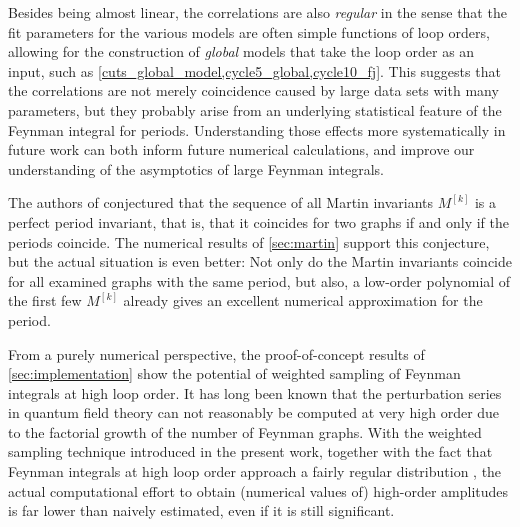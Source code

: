 \documentclass[12pt]{article}
\numberwithin{equation}{section}
\begin{document}
Besides being almost linear,  the correlations are also \emph{regular} in the sense that the fit parameters for the various models are often simple functions of loop orders, allowing for the construction of \emph{global} models that take the loop order as an input, such as \cref{cuts_global_model,cycle5_global,cycle10_fj}. This suggests that the correlations are not merely coincidence caused by large data sets with many parameters, but they probably arise from an underlying statistical feature of the Feynman integral for periods. Understanding those effects more systematically in future work can both inform future numerical calculations, and improve our understanding of the asymptotics of large Feynman integrals.  


The authors of \cite{panzer_feynman_2023}  conjectured that the sequence of all Martin invariants $M^{[k]}$ is a perfect period invariant, that is, that it coincides for two graphs if and only if the periods coincide. The numerical results of \cref{sec:martin} support this conjecture, but the actual situation is even better: Not only do the Martin invariants coincide for all examined graphs with the same period, but also, a low-order polynomial of the first few $M^{[k]}$ already gives an excellent numerical approximation for the period. 

From a purely numerical perspective, the proof-of-concept results of \cref{sec:implementation} show the potential of weighted sampling of Feynman integrals at high loop order. It has long been known that the perturbation series in quantum field theory can not reasonably be computed at very high order due to the factorial growth of the number of Feynman graphs. With the  weighted sampling technique introduced in the present work, together with the fact that Feynman integrals at high loop order approach a fairly regular distribution \cite{balduf_statistics_2023}, the actual computational effort to obtain (numerical values of) high-order amplitudes is far lower than naively estimated, even if it is still significant. 
\end{document}
